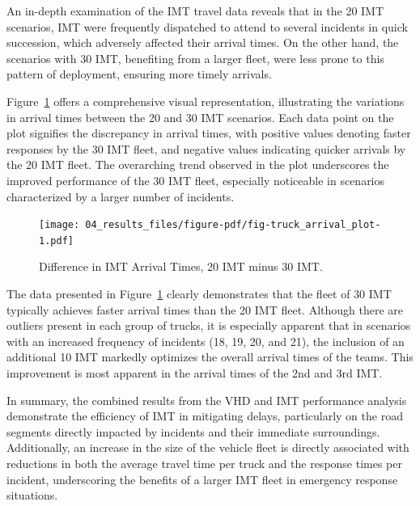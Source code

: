 \documentclass[fancy, oneside, mastersfancy, ms]{byuthesis}
\begin{document}
An in-depth examination of the IMT travel data reveals that in the 20
IMT scenarios, IMT were frequently dispatched to attend to several
incidents in quick succession, which adversely affected their arrival
times. On the other hand, the scenarios with 30 IMT, benefiting from a
larger fleet, were less prone to this pattern of deployment, ensuring
more timely arrivals.

Figure~\ref{fig-truck_arrival_plot} offers a comprehensive visual
representation, illustrating the variations in arrival times between the
20 and 30 IMT scenarios. Each data point on the plot signifies the
discrepancy in arrival times, with positive values denoting faster
responses by the 30 IMT fleet, and negative values indicating quicker
arrivals by the 20 IMT fleet. The overarching trend observed in the plot
underscores the improved performance of the 30 IMT fleet, especially
noticeable in scenarios characterized by a larger number of incidents.

\begin{figure}

{\centering \texttt{[image: 04\_results\_files/figure-pdf/fig-truck\_arrival\_plot-1.pdf]}

}

\caption{\label{fig-truck_arrival_plot}Difference in IMT Arrival Times,
20 IMT minus 30 IMT.}

\end{figure}

The data presented in Figure~\ref{fig-truck_arrival_plot} clearly
demonstrates that the fleet of 30 IMT typically achieves faster arrival
times than the 20 IMT fleet. Although there are outliers present in each
group of trucks, it is especially apparent that in scenarios with an
increased frequency of incidents (18, 19, 20, and 21), the inclusion of
an additional 10 IMT markedly optimizes the overall arrival times of the
teams. This improvement is most apparent in the arrival times of the 2nd
and 3rd IMT.

In summary, the combined results from the VHD and IMT performance
analysis demonstrate the efficiency of IMT in mitigating delays,
particularly on the road segments directly impacted by incidents and
their immediate surroundings. Additionally, an increase in the size of
the vehicle fleet is directly associated with reductions in both the
average travel time per truck and the response times per incident,
underscoring the benefits of a larger IMT fleet in emergency response
situations.

\end{document}
